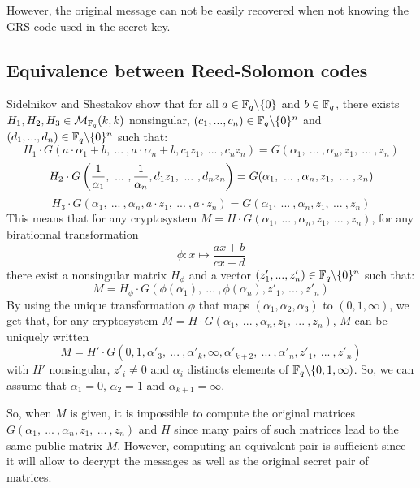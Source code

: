 \documentclass[12pt,a4paper,titlepage]{article}
\begin{document}
However, the original message can not be easily recovered when not knowing the GRS code used in the secret key.

\subsection{Equivalence between Reed-Solomon codes}

Sidelnikov and Shestakov show \cite{SidelShes92} that for all $a \in \mathbb{F}_q\backslash\{0\}$ and $b \in \mathbb{F}_q$, there exists $H_1, H_2, H_3 \in \mathcal{M}_{\mathbb{F}_q}(k,k)$ nonsingular, $(c_1,... ,c_n) \in \mathbb{F}_q\backslash\{0\}^{n}$ and $(d_1,... ,d_n) \in \mathbb{F}_q\backslash\{0\}^{n}$ such that:
\begin{equation}
H_1\cdot G(a\cdot\alpha_1 + b, \ ... \ , a\cdot \alpha_n + b, c_1z_1, \ ... \ , c_n z_n) = G(\alpha_1, \ ... \ , \alpha_n, z_1, \ ... \ , z_n)
\label{eq1}
\end{equation}
\begin{equation}
H_2\cdot G\left( \frac{1}{\alpha_1}, \ ... \ , \frac{1}{\alpha_n}, d_1z_1, \ ... \ , d_n z_n \right) = G(\alpha_1, \ ... \ , \alpha_n, z_1, \ ... \ , z_n) \\
\label{eq2}
\end{equation}
\begin{equation}
H_3\cdot G\left( \alpha_1, \ ... \ , \alpha_n, a\cdot z_1, \ ... \ , a\cdot z_n \right) = G(\alpha_1, \ ... \ , \alpha_n, z_1, \ ... \ , z_n)
\label{eq3}
\end{equation}
This means that for any cryptosystem $M = H\cdot G(\alpha_1, \ ... \ , \alpha_n, z_1, \ ... \ , z_n)$, for any birationnal transformation
$$ \phi : x \mapsto \frac{ax+b}{cx+d}$$
there exist a nonsingular matrix $H_{\phi}$ and a vector $(z'_1,... ,z'_n) \in \mathbb{F}_q\backslash\{0\}^{n}$ such that:
$$M = H_{\phi}\cdot G(\phi(\alpha_1), \ ... \ , \phi(\alpha_n), z'_1, \ ... \ , z'_n)$$
By using the unique transformation $\phi$ that maps $(\alpha_1, \alpha_2, \alpha_3)$ to $(0,1,\infty)$, we get that, for any cryptosystem $M = H\cdot G(\alpha_1, \ ... \ , \alpha_n, z_1, \ ... \ , z_n)$, $M$ can be uniquely written
$$ M = H'\cdot G(0, 1,\alpha'_3, \ ... \ ,\alpha'_k, \infty, \alpha'_{k+2}, \ ... \ , \alpha'_n, z'_1, \ ... \ , z'_n) $$
with $H'$ nonsingular, $z'_i \neq 0$ and $\alpha_i$ distincts elements of $\mathbb{F}_q\backslash\{0, 1, \infty)$.
So, we can assume that $\alpha_1 = 0$, $\alpha_2 = 1$ and $\alpha_{k+1} = \infty$.

So, when $M$ is given, it is impossible to compute the original matrices $G(\alpha_1, \ ... \ , \alpha_n, z_1, \ ... \ , z_n)$ and $H$ since many pairs of such matrices lead to the same public matrix $M$.
However, computing an equivalent pair is sufficient since it will allow to decrypt the messages as well as the original secret pair of matrices.
\end{document}
